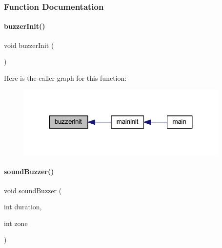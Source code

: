 \subsubsection{Function Documentation}
\mbox{\label{a00008_ab39bc50f65525981c015786371a7892f}} 
\paragraph{buzzer\+Init()}
{\footnotesize\ttfamily void buzzer\+Init (\begin{DoxyParamCaption}{ }\end{DoxyParamCaption})}

Here is the caller graph for this function\+:
\nopagebreak
\begin{figure}[H]
\begin{center}
\leavevmode
\includegraphics[width=299pt]{a00008_ab39bc50f65525981c015786371a7892f_icgraph}
\end{center}
\end{figure}
\mbox{\label{a00008_a31aed89a0638f80bd71a31c50f5cb3ff}} 
\paragraph{sound\+Buzzer()}
{\footnotesize\ttfamily void sound\+Buzzer (\begin{DoxyParamCaption}\item[{int}]{duration,  }\item[{int}]{zone }\end{DoxyParamCaption})}

